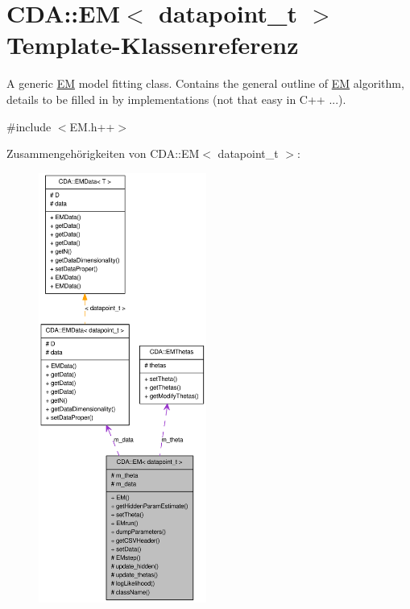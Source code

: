 \hypertarget{classCDA_1_1EM}{
\section{CDA::EM$<$ datapoint\_\-t $>$ Template-\/Klassenreferenz}
\label{classCDA_1_1EM}
}


A generic \hyperlink{classCDA_1_1EM}{EM} model fitting class. Contains the general outline of \hyperlink{classCDA_1_1EM}{EM} algorithm, details to be filled in by implementations (not that easy in C++ ...).  




{\ttfamily \#include $<$EM.h++$>$}



Zusammengehörigkeiten von CDA::EM$<$ datapoint\_\-t $>$:\nopagebreak
\begin{figure}[H]
\begin{center}
\leavevmode
\includegraphics[height=400pt]{classCDA_1_1EM__coll__graph}
\end{center}
\end{figure}

